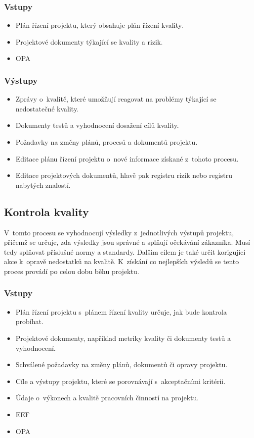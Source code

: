 \subsubsection*{Vstupy}
\begin{itemize}
    \item Plán řízení projektu, který obsahuje plán řízení kvality.
    \item Projektové dokumenty týkající se kvality a rizik.
    \item OPA
\end{itemize}
\subsubsection*{Výstupy}
\begin{itemize}
    \item Zprávy o~kvalitě, které umožňují reagovat na problémy týkající se nedostatečné kvality.  
    \item Dokumenty testů a vyhodnocení dosažení cílů kvality.
    \item Požadavky na změny plánů, procesů a dokumentů projektu.
    \item Editace plánu řízení projektu o~nové informace získané z~tohoto procesu.
    \item Editace projektových dokumentů, hlavě pak registru rizik nebo registru nabytých znalostí.
\end{itemize}

\subsection*{Kontrola kvality}

V~tomto procesu se vyhodnocují výsledky z~jednotlivých výstupů projektu, přičemž se určuje, zda výsledky jsou správné a splňují očekávání zákazníka. Musí tedy splňovat příslušné normy a standardy. Dalším cílem je také určit korigující akce k~opravě nedostatků na kvalitě. K~získání co nejlepších výsledů se tento proces provádí po celou dobu běhu projektu.


\subsubsection*{Vstupy}
\begin{itemize}
    \item Plán řízení projektu s~plánem řízení kvality určuje, jak bude kontrola probíhat.
    \item Projektové dokumenty, například metriky kvality či dokumenty testů a vyhodnocení.
    \item Schválené požadavky na změny plánů, dokumentů či opravy projektu.
    \item Cíle a výstupy projektu, které se porovnávají s~akceptačními kritérii.
    \item Údaje o~výkonech a kvalitě pracovních činností na projektu.
    \item EEF
    \item OPA
\end{itemize}
